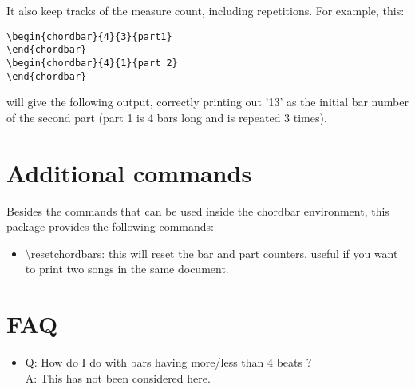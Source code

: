 \documentclass[11pt]{article}
\begin{document}
It also keep tracks of the measure count, including repetitions. For example, this:

\begin{lstlisting}
\begin{chordbar}{4}{3}{part1}
\end{chordbar}
\begin{chordbar}{4}{1}{part 2}
\end{chordbar}
\end{lstlisting}

will give the following output, correctly printing out '13' as the initial bar number of the second part (part 1 is 4 bars long and is repeated 3 times).

\resetchordbars
\begin{chordbar}{4}{3}{}
\end{chordbar}

\begin{chordbar}{4}{1}{}
\end{chordbar}

\section{Additional commands}

Besides the commands that can be used inside the chordbar environment, this package provides the following commands:

\begin{itemize}
\item {\ttfamily \textbackslash resetchordbars}: this will reset the bar and part counters, useful if you want to print two songs in the same document.
\end{itemize}


\section{FAQ}

\begin{itemize}
\item Q: How do I do with bars having more/less than 4 beats ? \\
A: This has not been considered here.
\end{itemize}
\end{document}
